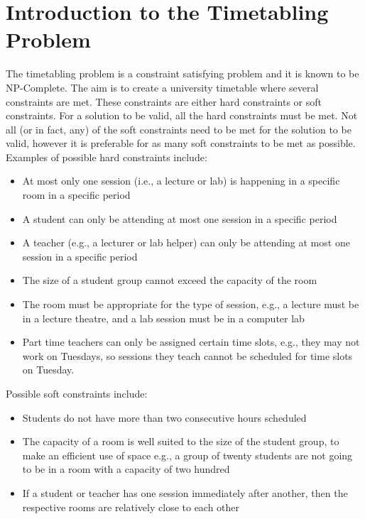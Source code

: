 \section{Introduction to the Timetabling Problem}

The timetabling problem is a constraint satisfying problem and it is known to
be NP-Complete.
The aim is to create a university timetable where several constraints are met.
These constraints are either hard constraints or soft constraints.
For a solution to be valid, all the hard constraints must be met.
Not all (or in fact, any) of the soft constraints need to be met for the
solution to be valid, however it is preferable for as many soft constraints to
be met as possible.
Examples of possible hard constraints include:

\begin{itemize}
	\item At most only one session (i.e., a lecture or lab) is happening in a 
		specific room in a specific period
	\item A student can only be attending at most one session in a specific 
		period
	\item A teacher (e.g., a lecturer or lab helper) can only be attending at 
		most one session in a specific period
	\item The size of a student group cannot exceed the capacity of the room
	\item The room must be appropriate for the type of session, e.g., a lecture 
		must be in a lecture theatre, and a lab session must be in a computer 
		lab
	\item Part time teachers can only be assigned certain time slots, e.g., they
		may not work on Tuesdays, so sessions they teach cannot be scheduled
		for time slots on Tuesday.
\end{itemize}

Possible soft constraints include:

\begin{itemize}
	\item Students do not have more than two consecutive hours scheduled
	\item The capacity of a room is well suited to the size of the student
		group, to make an efficient use of space e.g., a group of twenty
		students are not going to be in a room with a capacity of two hundred
	\item If a student or teacher has one session immediately after another,
		then the respective rooms are relatively close to each other
\end{itemize}

